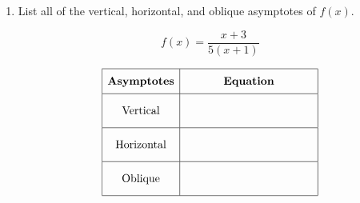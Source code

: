 \documentclass[11pt]{article}
\begin{document}
\begin{enumerate}
{\begin{enumerate}
{{range: \(\boxed{ y \neq 1 }\)

}
}

\item
{}

\end{enumerate}
}

\newpage

% 

\item %
\providecommand{\stxKnowl}{}\renewcommand{\stxKnowl}[1]{#1}
\providecommand{\stxOuttro}{}\renewcommand{\stxOuttro}[1]{#1}
\providecommand{\stxTitle}{}\renewcommand{\stxTitle}[1]{#1}
\renewcommand{\stxOuttro}[1]{}
\stxKnowl{
List all of the vertical, horizontal, and oblique asymptotes of \(f(x)\).

\[f(x) = \displaystyle{\frac{x + 3}{5(x + 1)}}\]

 \[\begin{array}{|c|c|} \hline \rule[-0.8em]{0pt}{2.2em} \textbf{Asymptotes} & \textbf{Equation} \\ \hline \rule[-1.2em]{0pt}{3em} \text{Vertical} & \text{\hspace{4cm}} \\ \hline \rule[-1.2em]{0pt}{3em} \text{Horizontal} & \text{\hspace{4cm}} \\ \hline \rule[-1.2em]{0pt}{3em} \text{Oblique} & \text{\hspace{4cm}} \\ \hline \end{array}\] 

\stxOuttro{
Solution

 \[\begin{array}{|c|c|} \hline \rule[-0.8em]{0pt}{2.2em} \textbf{Asymptotes} & \textbf{Equation} \\ \hline \rule[-1.2em]{0pt}{3em} \text{Vertical} & x = -1 \\ \hline \rule[-1.2em]{0pt}{3em} \text{Horizontal} & y = \frac{1}{5} \\ \hline \rule[-1.2em]{0pt}{3em} \text{Oblique} & \text{none} \\ \hline \end{array}\] 

}}
\end{enumerate}
\end{document}
